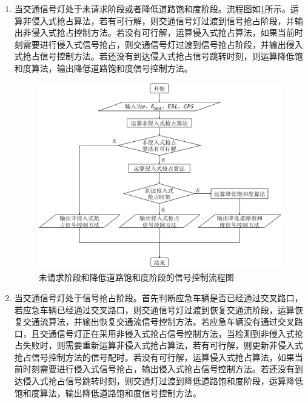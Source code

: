\begin{enumerate}
	\item 当交通信号灯处于未请求阶段或者降低道路饱和度阶段。流程图如\ref{fig:stage01}所示。运算非侵入式抢占算法，若有可行解，则交通信号灯过渡到信号抢占阶段，并输出非侵入式抢占控制方法。若没有可行解，运算侵入式抢占算法，如果当前时刻需要进行侵入式信号抢占，则交通信号灯过渡到信号抢占阶段，并输出侵入式抢占信号控制方法。若还没有到达侵入式抢占信号跳转时刻，则运算降低饱和度算法，输出降低道路饱和度信号控制方法。
	
	
	
	\begin{figure}[H]
		\centering
		\includegraphics[width=\linewidth]{figures/stage_0_1}
		\caption{未请求阶段和降低道路饱和度阶段的信号控制流程图}
		\label{fig:stage01}
	\end{figure}
	
	\item 当交通信号灯处于信号抢占阶段。首先判断应急车辆是否已经通过交叉路口，若应急车辆已经通过交叉路口，则交通信号灯过渡到恢复交通流阶段，运算恢复交通流算法，并输出恢复交通流信号控制方法。若应急车辆没有通过交叉路口，且交通信号灯正在采用非侵入式抢占信号控制方法，当检测到非侵入式抢占失败时，则需要重新运算非侵入式抢占算法，若有可行解，则更新非侵入式抢占信号控制方法的信号配时。若没有可行解，运算侵入式抢占算法，如果当前时刻需要进行侵入式信号抢占，输出侵入式抢占信号控制方法。若还没有到达侵入式抢占信号跳转时刻，则交通灯过渡到降低道路饱和度阶段，运算降低饱和度算法，输出降低道路饱和度信号控制方法。
	

\end{enumerate}

